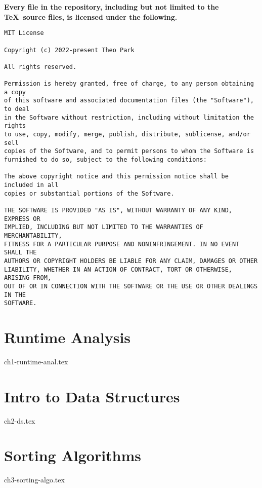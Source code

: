 \documentclass{report}
\begin{document}
\noindent \textbf{Every file in the repository, including but not limited to the \TeX\ source files, is licensed under the following.}
\begin{verbatim}
MIT License

Copyright (c) 2022-present Theo Park

All rights reserved.

Permission is hereby granted, free of charge, to any person obtaining a copy
of this software and associated documentation files (the "Software"), to deal
in the Software without restriction, including without limitation the rights
to use, copy, modify, merge, publish, distribute, sublicense, and/or sell
copies of the Software, and to permit persons to whom the Software is
furnished to do so, subject to the following conditions:

The above copyright notice and this permission notice shall be included in all
copies or substantial portions of the Software.

THE SOFTWARE IS PROVIDED "AS IS", WITHOUT WARRANTY OF ANY KIND, EXPRESS OR
IMPLIED, INCLUDING BUT NOT LIMITED TO THE WARRANTIES OF MERCHANTABILITY,
FITNESS FOR A PARTICULAR PURPOSE AND NONINFRINGEMENT. IN NO EVENT SHALL THE
AUTHORS OR COPYRIGHT HOLDERS BE LIABLE FOR ANY CLAIM, DAMAGES OR OTHER
LIABILITY, WHETHER IN AN ACTION OF CONTRACT, TORT OR OTHERWISE, ARISING FROM,
OUT OF OR IN CONNECTION WITH THE SOFTWARE OR THE USE OR OTHER DEALINGS IN THE
SOFTWARE.
\end{verbatim}


\chapter{Runtime Analysis}
{ch1-runtime-anal.tex}


\chapter{Intro to Data Structures}
{ch2-ds.tex}


\chapter{Sorting Algorithms}
{ch3-sorting-algo.tex}

\end{document}
